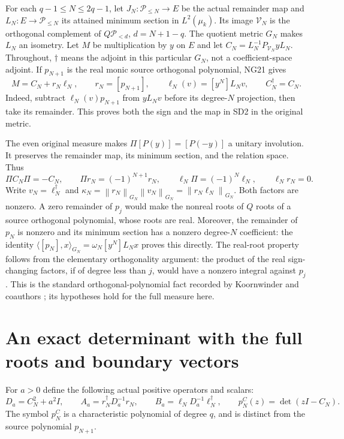 \documentclass[11pt]{article}
\newcommand{\PP}{\mathcal P}\newcommand{\dd}{\,d}
\newcommand{\norm}[1]{\left\lVert#1\right\rVert}
\begin{document}
For each $q-1\le N\le2q-1$, let $J_N:\PP_{\le N}\to E$ be the
actual remainder map and $L_N:E\to\PP_{\le N}$ its attained minimum
section in $L^2(\mu_k)$. Its image $\mathcal V_N$ is the orthogonal
complement of $Q\PP_{<d}$, $d=N+1-q$. The quotient metric $G_N$ makes
$L_N$ an isometry. Let $M$ be multiplication by $y$ on $E$ and let
$C_N=L_N^{-1}P_{\mathcal V_N}yL_N$. Throughout, $\dagger$ means the
adjoint in this particular $G_N$, not a coefficient-space adjoint.
If $p_{N+1}$ is the real monic source orthogonal polynomial, NG21 gives
\begin{equation}\tag{SD2}
M=C_N+r_N\ell_N,\qquad r_N=[p_{N+1}],\qquad
\ell_N(v)=[y^N]L_Nv,\qquad C_N^\dagger=C_N.
\end{equation}
Indeed, subtract $\ell_N(v)p_{N+1}$ from $yL_Nv$ before its degree-$N$
projection, then take its remainder. This proves both the sign and the
map in SD2 in the original metric.

The even original measure makes $\Pi[P(y)]=[P(-y)]$ a unitary involution.
It preserves the remainder map, its minimum section, and the relation
space. Thus
\begin{equation}\tag{SD3}
\Pi C_N\Pi=-C_N,\qquad
\Pi r_N=(-1)^{N+1}r_N,\qquad
\ell_N\Pi=(-1)^N\ell_N,\qquad \ell_Nr_N=0.
\end{equation}
Write $v_N=\ell_N^\dagger$ and
$\kappa_N=\norm{r_N}_{G_N}\norm{v_N}_{G_N}=\norm{r_N\ell_N}_{G_N}$.
Both factors are nonzero. A zero remainder of $p_j$ would make the
nonreal roots of $Q$ roots of a source orthogonal polynomial, whose
roots are real. Moreover, the remainder of $p_N$ is nonzero and its
minimum section has a nonzero degree-$N$ coefficient: the identity
$\langle[p_N],x\rangle_{G_N}=\omega_N[y^N]L_Nx$ proves this directly.
The real-root property follows from the elementary orthogonality
argument: the product of the real sign-changing factors, if of degree
less than $j$, would have a nonzero integral against $p_j$. This is the
standard orthogonal-polynomial fact recorded by Koornwinder and
coauthors \cite{DLMF}; its hypotheses hold for the full measure here.

\section{An exact determinant with the full roots and boundary vectors}
For $a>0$ define the following actual positive operators and scalars:
\begin{equation}\tag{SD4}
D_a=C_N^2+a^2I,\qquad
A_a=r_N^\dagger D_a^{-1}r_N,\qquad
B_a=\ell_ND_a^{-1}\ell_N^\dagger,\qquad
p_N^C(z)=\det(zI-C_N).
\end{equation}
The symbol $p_N^C$ is a characteristic polynomial of degree $q$, and
is distinct from the source polynomial $p_{N+1}$.
\end{document}
